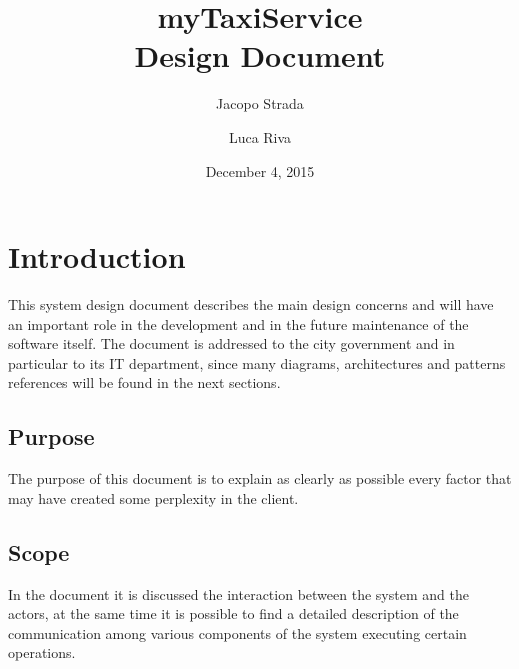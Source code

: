 \documentclass[a4paper]{article}
\title{{\Huge myTaxiService} \\ Design Document}
\author{Jacopo Strada \and Luca Riva}
\date{December 4, 2015}
\begin{document}
\maketitle

\newpage

\tableofcontents

\newpage

\vfill

\listoffigures 

\vfill

\listoftables

\vfill

\listofalgorithms

\vfill

\let\stdsection\section
\renewcommand\section{\newpage\stdsection}

\setlength{\parindent}{0em}
\setlength{\parskip}{1em}

\section{Introduction}
This system design document describes the main design concerns and will have an important role in the development and in the future maintenance of the software itself. The document is addressed to the city government and in particular to its IT department, since many diagrams, architectures and patterns references will be found in the next sections.

\subsection{Purpose}
The purpose of this document is to explain as clearly as possible every factor that may have created some perplexity in the client.

\subsection{Scope}
In the document it is discussed the interaction between the system and the actors, at the same time it is possible to find a detailed description of the communication among various components of the system executing certain operations.
\end{document}
